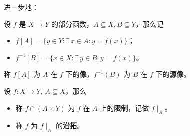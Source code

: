 进一步地：

\begin{definition}
    设 $f$ 是 $X \to Y$ 的部分函数，$A \subseteq X, B \subseteq Y$，那么记
    \begin{itemize}
        \item $f[A] = \{y \in Y: \exists\,x \in A: y = f(x)\}$；
        \item $f^{-1}[B] = \{x \in X: \exists\,y \in B: y = f(x)\}$。
    \end{itemize}
    称 $f[A]$ 为 $A$ 在 $f$ 下的\textbf{像}，$f^{-1}(B)$ 为 $B$ 在 $f$ 下的\textbf{源像}。
\end{definition}

\begin{definition}[函数的限制和沿拓]
    设 $f: X \to Y,\ A \subseteq X$，那么
    \begin{itemize}
        \item 称 $f \cap (A \times Y)$ 为 $f$ 在 $A$ 上的\textbf{限制}，记做 $f \mid_A$。
        \item 称 $f$ 为 $f \mid_A$ 的\textbf{沿拓}。
    \end{itemize}
\end{definition}
